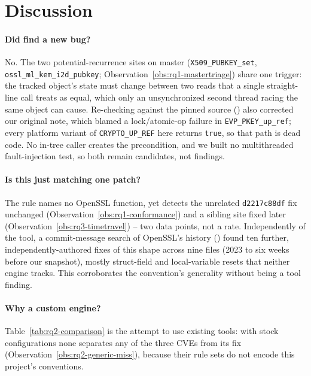 \section{Discussion}
\label{sec:discussion}

\paragraph{Did \tool find a new bug?} No. The two potential-recurrence sites
on master (\texttt{X509\_PUBKEY\_set}, \texttt{ossl\_ml\_kem\_i2d\_pubkey};
Observation~\ref{obs:rq1-mastertriage}) share one trigger: the tracked
object's state must change between two reads that a single straight-line
call treats as equal, which only an unsynchronized second thread racing
the same object can cause. Re-checking against the pinned source
() also corrected our original
note, which blamed a lock/atomic-op failure in \texttt{EVP\_PKEY\_up\_ref};
every platform variant of \texttt{CRYPTO\_UP\_REF} here returns
\texttt{true}, so that path is dead code. No in-tree caller creates the
precondition, and we built no multithreaded fault-injection test, so both
remain candidates, not findings.

\paragraph{Is this just matching one patch?} The rule names no OpenSSL
function, yet detects the unrelated \texttt{d2217c88df} fix unchanged
(Observation~\ref{obs:rq1-conformance}) and a sibling site fixed later
(Observation~\ref{obs:rq3-timetravel}) -- two data points, not a rate.
Independently of the tool, a commit-message search of OpenSSL's history
() found ten further,
independently-authored fixes of this shape across nine files (2023 to six
weeks before our snapshot), mostly struct-field and local-variable resets
that neither engine tracks. This corroborates the convention's generality
without being a tool finding.

\paragraph{Why a custom engine?} Table~\ref{tab:rq2-comparison} is the
attempt to use existing tools: with stock configurations none separates
any of the three CVEs from its fix (Observation~\ref{obs:rq2-generic-miss}),
because their rule sets do not encode this project's conventions.

